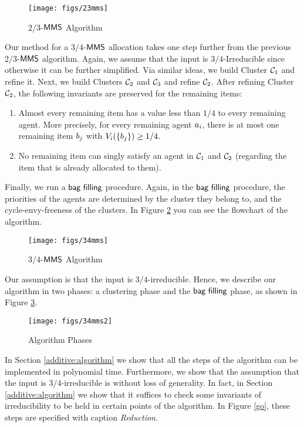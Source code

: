 \begin{figure}[h]
\centerline{
\texttt{[image: figs/23mms]}
}
\caption{$2/3$-$\mathsf{MMS}$ Algorithm}
\label{23mms}
\end{figure}     

Our method for a $3/4$-$\mathsf{MMS}$ allocation takes one step further from the previous $2/3$-$\mathsf{MMS}$ algorithm.  Again, we assume that the input is $3/4$-Irreducible since otherwise it can be further simplified.  Via similar ideas, we build Cluster $\mathcal{C}_1$ and refine it. Next, we build Clusters $\mathcal{C}_2$ and $\mathcal{C}_3$ and refine $\mathcal{C}_2$. After refining Cluster $\mathcal{C}_2$, the following invariants are preserved for the remaining items:
\begin{enumerate}
\item Almost every remaining item has a value less than $1/4$ to every remaining agent. More precisely, for every remaining agent $a_i$, there is at most one remaining item $b_j$ with $V_i(\{b_j\}) \geq 1/4$.
\item  No remaining item can singly satisfy an agent in $\mathcal{C}_1$ and $\mathcal{C}_2$ (regarding the item that is already allocated to them).
\end{enumerate} 


Finally, we run a $\textsf{bag filling}$ procedure. Again, in the $\textsf{bag filling}$ procedure, the priorities of the agents are determined by the cluster they belong to, and the cycle-envy-freeness of the clusters. In Figure \ref{34mms} you can see the flowchart of the algorithm.


\begin{figure}[h]
\centerline{
\texttt{[image: figs/34mms]}
}
\caption{$3/4$-$\mathsf{MMS}$ Algorithm}
\label{34mms}
\end{figure}     

Our assumption is that the input is $3/4$-irreducible. Hence, we describe our algorithm in two phases: a clustering phase and the $\textsf{bag filling}$ phase, as shown in Figure \ref{34mms2}. 
\begin{figure}[h]
\centerline{
\texttt{[image: figs/34mms2]}
}
\caption{Algorithm Phases}
\label{34mms2}
\end{figure}     
In Section \ref{additive:algorithm} we show that all the steps of the algorithm can be implemented in polynomial time. Furthermore, we show that the assumption that the input is $3/4$-irreducible is without loss of generality. In fact, in Section \ref{additive:algorithm} we show that it suffices to check some invariants of irreducibility to be held in certain points of the algorithm. In Figure \ref{go}, these steps are specified with caption \emph{Reduction}. 

